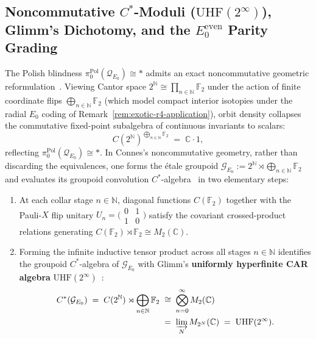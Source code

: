 \subsection{Noncommutative $C^*$-Moduli ($\mathrm{UHF}(2^\infty)$), Glimm's Dichotomy, and the $E_0^{\mathrm{even}}$ Parity Grading}\label{subsec:uhf-cstar-e0}

The Polish blindness $\pi_0^{\mathrm{Pol}}(\mathcal{Q}_{E_0}) \cong *$ admits an exact noncommutative geometric reformulation~\cite[Ch.~II, \S\S 7--8]{Connes94}. Viewing Cantor space $2^{\mathbb{N}} \cong \prod_{n \in \mathbb{N}} \mathbb{F}_2$ under the action of finite coordinate flips $\bigoplus_{n \in \mathbb{N}} \mathbb{F}_2$ (which model compact interior isotopies under the radial $E_0$ coding of Remark~\ref{rem:exotic-r4-application}), orbit density collapses the commutative fixed-point subalgebra of continuous invariants to scalars:
\[
  C(2^{\mathbb{N}})^{\bigoplus_{n \in \mathbb{N}} \mathbb{F}_2} \;=\; \mathbb{C}\cdot 1,
\]
reflecting $\pi_0^{\mathrm{Pol}}(\mathcal{Q}_{E_0}) \cong *$. In Connes's noncommutative geometry, rather than discarding the equivalences, one forms the étale groupoid $\mathcal{G}_{E_0} := 2^{\mathbb{N}} \rtimes \bigoplus_{n \in \mathbb{N}} \mathbb{F}_2$ and evaluates its groupoid convolution $C^*$-algebra~\cite[Ch.~II]{Connes94} in two elementary steps:
\begin{enumerate}
  \item At each collar stage $n \in \mathbb{N}$, diagonal functions $C(\mathbb{F}_2)$ together with the Pauli-$X$ flip unitary $U_n = \bigl(\begin{smallmatrix} 0 & 1 \\ 1 & 0 \end{smallmatrix}\bigr)$ satisfy the covariant crossed-product relations generating $C(\mathbb{F}_2) \rtimes \mathbb{F}_2 \cong M_2(\mathbb{C})$.
  \item Forming the infinite inductive tensor product across all stages $n \in \mathbb{N}$ identifies the groupoid $C^*$-algebra of $\mathcal{G}_{E_0}$ with Glimm's \textbf{uniformly hyperfinite CAR algebra} $\mathrm{UHF}(2^\infty)$~\cite{Glimm60}:
  \[
    \begin{aligned}
      C^*(\mathcal{G}_{E_0}) \;=\; C(2^{\mathbb{N}}) \rtimes \bigoplus_{n \in \mathbb{N}} \mathbb{F}_2
      &\;\cong\; \bigotimes_{n=0}^{\infty} M_2(\mathbb{C}) \\
      &\;=\; \varinjlim_N M_{2^N}(\mathbb{C}) \;=\; \mathrm{UHF}(2^\infty).
    \end{aligned}
  \]
\end{enumerate}

